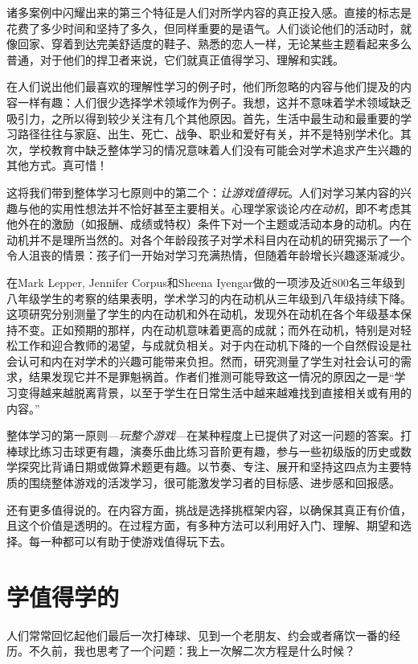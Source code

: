 诸多案例中闪耀出来的第三个特征是人们对所学内容的真正投入感。直接的标志是花费了多少时间和坚持了多久，但同样重要的是语气。人们谈论他们的活动时，就像回家、穿着到达完美舒适度的鞋子、熟悉的恋人一样，无论某些主题看起来多么普通，对于他们的捍卫者来说，它们就真正值得学习、理解和实践。

在人们说出他们最喜欢的理解性学习的例子时，他们所忽略的内容与他们提及的内容一样有趣：人们很少选择学术领域作为例子。我想，这并不意味着学术领域缺乏吸引力，之所以得到较少关注有几个其他原因。首先，生活中最生动和最重要的学习路径往往与家庭、出生、死亡、战争、职业和爱好有关，并不是特别学术化。其次，学校教育中缺乏整体学习的情况意味着人们没有可能会对学术追求产生兴趣的其他方式。真可惜！

这将我们带到整体学习七原则中的第二个：\textit{让游戏值得玩}。人们对学习某内容的兴趣与他的实用性想法并不恰好甚至主要相关。心理学家谈论\textit{内在动机}，即不考虑其他外在的激励（如报酬、成绩或特权）条件下对一个主题或活动本身的动机。内在动机并不是理所当然的。对各个年龄段孩子对学术科目内在动机的研究揭示了一个令人沮丧的情景：孩子们一开始对学习充满热情，但随着年龄增长兴趣逐渐减少。

在Mark Lepper, Jennifer Corpus和Sheena Iyengar做的一项涉及近800名三年级到八年级学生的考察的结果表明，学术学习的内在动机从三年级到八年级持续下降。这项研究分别测量了学生的内在动机和外在动机，发现外在动机在各个年级基本保持不变。正如预期的那样，内在动机意味着更高的成就；而外在动机，特别是对轻松工作和迎合教师的渴望，与成就负相关。对于内在动机下降的一个自然假设是社会认可和内在对学术的兴趣可能带来负担。然而，研究测量了学生对社会认可的需求，结果发现它并不是罪魁祸首。作者们推测可能导致这一情况的原因之一是“学习变得越来越脱离背景，以至于学生在日常生活中越来越难找到直接相关或有用的内容。”

整体学习的第一原则---\textit{玩整个游戏}---在某种程度上已提供了对这一问题的答案。打棒球比练习击球更有趣，演奏乐曲比练习音阶更有趣，参与一些初级版的历史或数学探究比背诵日期或做算术题更有趣。以节奏、专注、展开和坚持这四点为主要特质的围绕整体游戏的活泼学习，很可能激发学习者的目标感、进步感和回报感。

还有更多值得说的。在内容方面，挑战是选择挑框架内容，以确保其真正有价值，且这个价值是透明的。在过程方面，有多种方法可以利用好入门、理解、期望和选择。每一种都可以有助于使游戏值得玩下去。

\section*{学值得学的}

人们常常回忆起他们最后一次打棒球、见到一个老朋友、约会或者痛饮一番的经历。不久前，我也思考了一个问题：我上一次解二次方程是什么时候？

